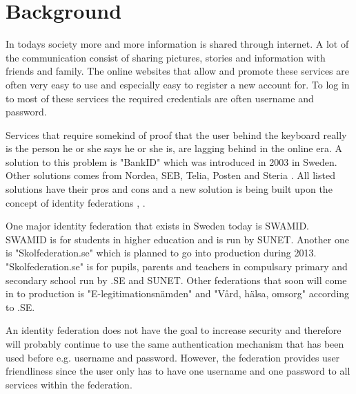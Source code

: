\section{Background}
In todays society more and more information is shared through internet.
A lot of the communication consist of sharing pictures, stories and information with friends and family.
The online websites that allow and promote these services are often very easy to use and especially easy to register a new account for.
To log in to most of these services the required credentials are often username and password. 

Services that require somekind of proof that the user behind the keyboard really is the person he or she says he or she is, are lagging behind in the online era.
A solution to this problem is "BankID" which was introduced in 2003 \cite{website:bankid-about} in Sweden.
Other solutions comes from Nordea, SEB, Telia, Posten and Steria \cite[p.~256]{pdf:SOU}.
All listed solutions have their pros and cons and a new solution is being built upon the concept of identity federations \cite[p.~23]{pdf:SOU}, \cite{website:elegnamnd}.


One major identity federation that exists in Sweden today is SWAMID. SWAMID is for students in higher education and is run by SUNET.
Another one is "Skolfederation.se" which is planned to go into production during 2013.
"Skolfederation.se" is for pupils, parents and teachers in compulsary primary and secondary school run by .SE and SUNET. 
Other federations that soon will come in to production is "E-legitimationsn{\"a}mden" \cite{website:elegnamnd} and "V\r{a}rd, h{\"a}lsa, omsorg" according to .SE.  

An identity federation does not have the goal to increase security and therefore will probably continue to use the same authentication mechanism that has been used before e.g. username and password. 
However, the federation provides user friendliness since the user only has to have one username and one password to all services within the federation. 

